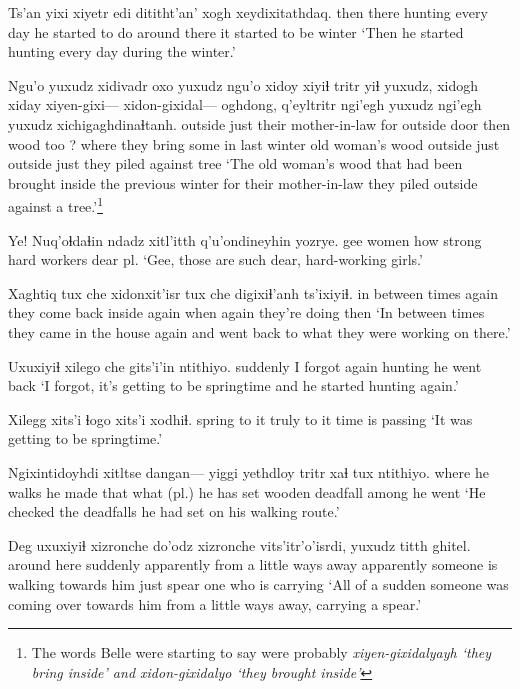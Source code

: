 \documentclass[12pt]{article}
\begin{document}
\gll Ts'an yixi  xiyetr  edi       dititht'an'      xogh         xeydixitathdaq.
then  there hunting {every day} {he started to do} {around there} {it started to be winter}
\glt `Then he started hunting every day during the winter.'
\glend

\gll Ngu'o yuxudz xidivadr            oxo yuxudz ngu'o xidoy xiyiɬ tritr yiɬ yuxudz, xidogh xiday xiyen-gixi---  xidon-gixidal--- oghdong, q'eyltritr       ngi'egh yuxudz ngi'egh yuxudz xichigaghdinaɬtanh.  
outside  just   {their mother-in-law} for   {}     outside  door then      wood too {} ?   where {} {they bring some in}       {last winter} {old woman's wood} outside just   outside just {they piled against tree}
\glt `The old woman's wood that had been brought inside the previous winter for their mother-in-law they piled outside against a tree.'\footnote{The words Belle were starting to say were probably \em xiyen-gixidalyayh \em `they bring inside' \em and \em xidon-gixidalyo \em `they brought inside'}
\glend

\gll Ye! Nuq'oɬdaɬin ndadz xitl'itth {q'u'ondineyhin} yozrye.
gee women       how   strong    {hard workers}      {dear pl.}
\glt `Gee, those are such dear, hard-working girls.'
\glend

\gll Xaghtiq tux      che   xidonxit'isr           tux  che   digixiɬ'anh   ts'ixiyiɬ.
{in between} times again {they come back inside again} when again {they're doing} then
\glt `In between times they came in the house again and went back to what they were working on there.'
\glend

\gll Uxuxiyiɬ xilego          che   gits'i'in ntithiyo.
suddenly {I forgot} again hunting {he went back}
\glt `I forgot, it's getting to be springtime and he started hunting again.'
\glend

\gll Xilegg xits'i ɬogo xits'i xodhiɬ.
spring {to it}    truly {to it} {time is passing}
\glt `It was getting to be springtime.'
\glend

\gll Ngixintidoyhdi xitltse dangan--- yiggi yethdloy tritr  xaɬ      tux   ntithiyo.
{where he walks} {he made} {} that  {what (pl.) he has set}   wooden deadfall among {he went}
\glt `He checked the deadfalls he had set on his walking route.'
\glend

\gll Deg         uxuxiyiɬ xizronche do'odz xizronche vits'itr'o'isrdi, yuxudz titth ghitel.
{around here} suddenly      apparently    {from a little ways away} apparently {someone is walking towards him} just spear {one who is carrying}
\glt `All of a sudden someone was coming over towards him from a little ways away, carrying a spear.'
\glend
\end{document}
